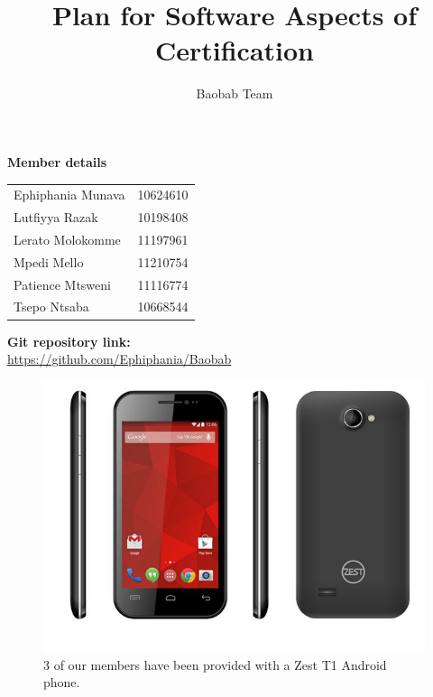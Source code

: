 \documentclass[a4paper]{article}
\title{Plan for Software Aspects of Certification}
\author{Baobab Team}
\begin{document}
\newpage


\newpage

\begin{center}
\textbf{\LARGE Member details\\}
\begin{tabular}{lr}
\\
Ephiphania Munava&10624610\\
Lutfiyya Razak&10198408\\
Lerato Molokomme&11197961\\
Mpedi Mello&11210754\\
Patience Mtsweni&11116774\\
Tsepo Ntsaba&10668544\\
\end{tabular}

\vspace{3cm}
\textbf{\LARGE Git repository link:\\}
\url{https://github.com/Ephiphania/Baobab}
\end{center}

\newpage

\tableofcontents
\listoffigures
\newpage
\setlength{\voffset}{-1cm}

\begin{center}
\begin{figure}
\includegraphics[width=1\linewidth]{./pictures/linphone.jpeg}
\caption{\label{fig:Linphone}3 of our members have been provided with a Zest T1 Android phone.}
\end{figure}
\end{center}

\newpage
\end{document}
